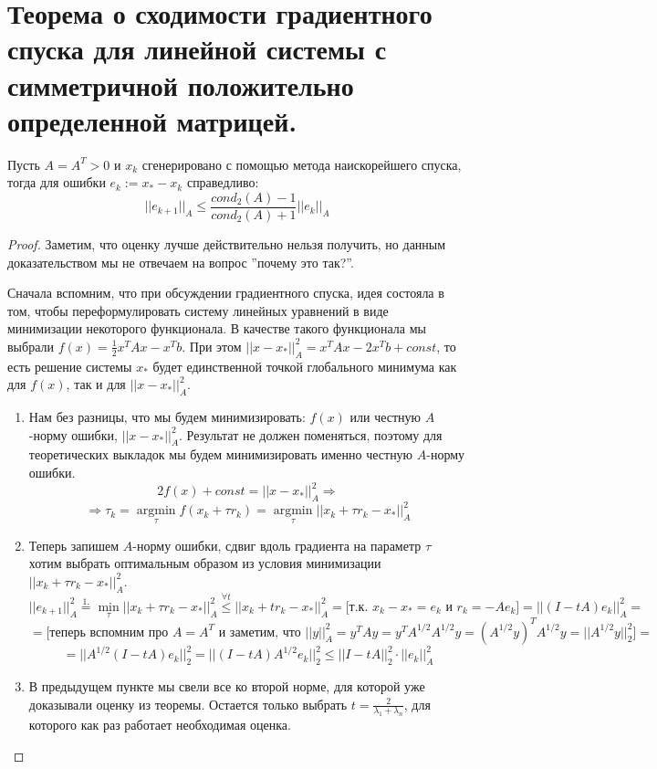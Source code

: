 \section{Теорема о сходимости градиентного спуска для линейной системы с симметричной положительно определенной матрицей.}

\begin{theorem*}
    Пусть $A = A^T > 0$ и $x_k$ сгенерировано с помощью метода наискорейшего спуска, тогда для ошибки $e_k := x_* - x_k$ справедливо:
    $$||e_{k + 1}||_A \leq \frac{cond_2(A) - 1}{cond_2(A) + 1} ||e_k||_A$$
\end{theorem*}

\begin{proof}
    Заметим, что оценку лучше действительно нельзя получить, но данным доказательством мы не отвечаем на вопрос ''почему это так?''.
    
    Сначала вспомним, что при обсуждении градиентного спуска, идея состояла в том, чтобы переформулировать систему линейных уравнений в виде минимизации некоторого функционала. В качестве такого функционала мы выбрали $f(x) = \frac{1}{2}x^TAx - x^Tb$. При этом $||x - x_*||^2_A = x^TAx - 2x^Tb + const$, то есть решение системы $x_*$ будет единственной точкой глобального минимума как для $f(x)$, так и для $||x - x_*||^2_A$.
    
    \begin{enumerate}
        \item Нам без разницы, что мы будем минимизировать: $f(x)$ или честную $A$-норму ошибки, $||x - x_*||^2_A$. Результат не должен поменяться, поэтому для теоретических выкладок мы будем минимизировать именно честную $A$-норму ошибки.
        $$2f(x) + const = ||x - x_*||^2_A \Rightarrow$$
        $$\Rightarrow \tau_k = \underset{\tau}{\operatorname{argmin}} f(x_k + \tau r_k) = \underset{\tau}{\operatorname{argmin}} ||x_k + \tau r_k - x_*||^2_A$$
        
        \item Теперь запишем $A$-норму ошибки, сдвиг вдоль градиента на параметр $\tau$ хотим выбрать оптимальным образом из условия минимизации $||x_k + \tau r_k - x_*||^2_A$.
        $$||e_{k + 1}||^2_A \overset{1.}{\operatorname{\textrm{ } = \textrm{ }}} \underset{\tau}{\operatorname{min}} ||x_k + \tau r_k - x_*||^2_A \overset{\forall t}{\operatorname{\textrm{ } \leq \textrm{ }}} ||x_k + tr_k - x_*||^2_A = \Big[ \textrm{т.к. } x_k - x_* = e_k \textrm{ и } r_k = -Ae_k \Big] = ||(I - tA)e_k||^2_A =$$
        $$= \Big[ \textrm{теперь вспомним про $A = A^T$ и заметим, что } ||y||^2_A = y^TAy = y^TA^{1/2}A^{1/2}y = (A^{1/2}y)^TA^{1/2}y = ||A^{1/2}y||^2_2 \Big] =$$
        $$= ||A^{1/2}(I - tA)e_k||^2_2 = ||(I - tA)A^{1/2}e_k||^2_2 \leq ||I - tA||^2_2  \cdot ||e_k||^2_A$$
        
        \item В предыдущем пункте мы свели все ко второй норме, для которой уже доказывали оценку из теоремы. Остается только выбрать $t = \frac{2}{\lambda_1 + \lambda_n}$, для которого как раз работает необходимая оценка.
    \end{enumerate}
\end{proof}
